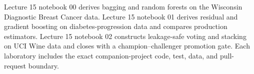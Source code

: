 \begin{notebooklink}
Lecture 15 notebook 00 derives bagging and random forests on the Wisconsin
Diagnostic Breast Cancer data. Lecture 15 notebook 01 derives residual and
gradient boosting on diabetes-progression data and compares production
estimators. Lecture 15 notebook 02 constructs leakage-safe voting and stacking
on UCI Wine data and closes with a champion--challenger promotion gate. Each
laboratory includes the exact companion-project code, test, data, and pull-
request boundary.
\end{notebooklink}
